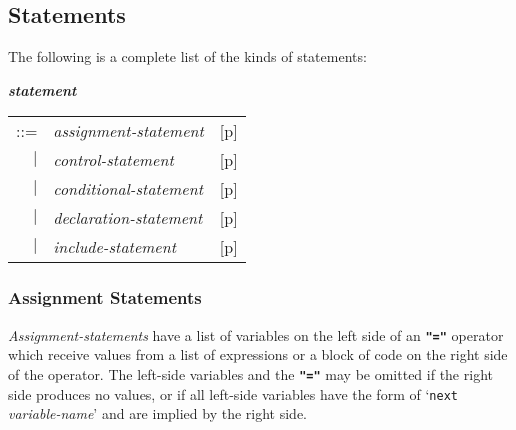 \documentclass[12pt]{article}
\newcommand{\TT}[1]{{\tt \bfseries #1}}
\newcommand{\emkey}[1]{{\em \bfseries #1}}
\newcommand{\pagref}[1]{p\pageref{#1}}
\newenvironment{indpar}[1][0.3in]%
	{\begin{list}{}%
		     {\setlength{\itemsep}{0in}%
		      \setlength{\topsep}{0in}%
		      \setlength{\parsep}{1ex}%
		      \setlength{\labelwidth}{#1}%
		      \setlength{\leftmargin}{#1}%
		      \addtolength{\leftmargin}{\labelsep}}%
	 \item}%
	{\end{list}}
\begin{document}
\subsection{Statements}
\label{STATEMENTS}

The following is a complete list of the kinds of statements:
\begin{indpar}
\emkey{statement}\label{STATEMENT}
    \begin{tabular}[t]{@{}rll}
    ::= & {\em assignment-statement}
        & [\pagref{ASSIGNMENT-STATEMENTS}] \\
    $|$ & {\em control-statement}
        & [\pagref{CONTROL-STATEMENT}] \\
    $|$ & {\em conditional-statement}
        & [\pagref{CONDITIONAL-STATEMENTS}] \\
    $|$ & {\em declaration-statement}
        & [\pagref{DECLARATION-STATEMENT}] \\
    $|$ & {\em include-statement}
        & [\pagref{INCLUDE-STATEMENT}] \\
    \end{tabular}
\end{indpar}

\subsubsection{Assignment Statements}
\label{ASSIGNMENT-STATEMENTS}

{\em Assignment-statements} have a list of variables on the
left side of an \TT{"="} operator
which receive values from a list of expressions or
a block of code on the right side of the operator.  The left-side variables
and the \TT{"="}
may be omitted if the right side produces no values,
or if all left-side variables
have the form of `{\tt next} {\em variable-name}' and are
implied by the right side.
\end{document}
